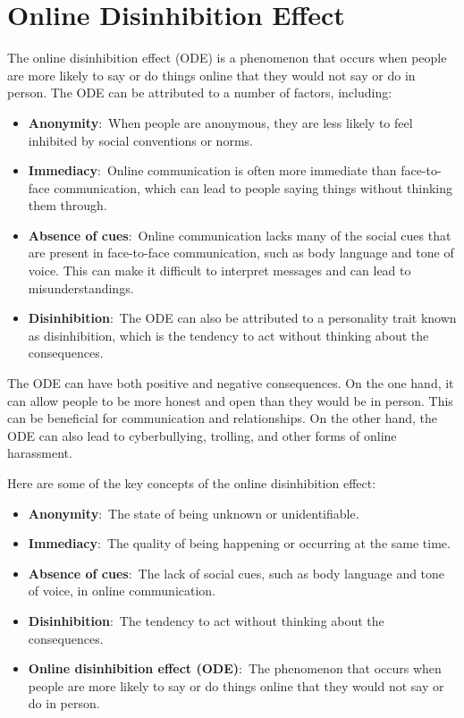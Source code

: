 \documentclass[
]{book}
\begin{document}
\section{Online Disinhibition Effect}\label{online-disinhibition-effect}

The online disinhibition effect (ODE) is a phenomenon that occurs when people are more likely to say or do things online that they would not say or do in person. The ODE can be attributed to a number of factors, including:

\begin{itemize}
\item
  \textbf{Anonymity}:~When people are anonymous, they are less likely to feel inhibited by social conventions or norms.
\item
  \textbf{Immediacy}:~Online communication is often more immediate than face-to-face communication, which can lead to people saying things without thinking them through.
\item
  \textbf{Absence of cues}:~Online communication lacks many of the social cues that are present in face-to-face communication, such as body language and tone of voice. This can make it difficult to interpret messages and can lead to misunderstandings.
\item
  \textbf{Disinhibition}:~The ODE can also be attributed to a personality trait known as disinhibition, which is the tendency to act without thinking about the consequences.
\end{itemize}

The ODE can have both positive and negative consequences. On the one hand, it can allow people to be more honest and open than they would be in person. This can be beneficial for communication and relationships. On the other hand, the ODE can also lead to cyberbullying, trolling, and other forms of online harassment.

Here are some of the key concepts of the online disinhibition effect:

\begin{itemize}
\item
  \textbf{Anonymity}:~The state of being unknown or unidentifiable.
\item
  \textbf{Immediacy}:~The quality of being happening or occurring at the same time.
\item
  \textbf{Absence of cues}:~The lack of social cues, such as body language and tone of voice, in online communication.
\item
  \textbf{Disinhibition}:~The tendency to act without thinking about the consequences.
\item
  \textbf{Online disinhibition effect (ODE)}:~The phenomenon that occurs when people are more likely to say or do things online that they would not say or do in person.
\end{itemize}
\end{document}
